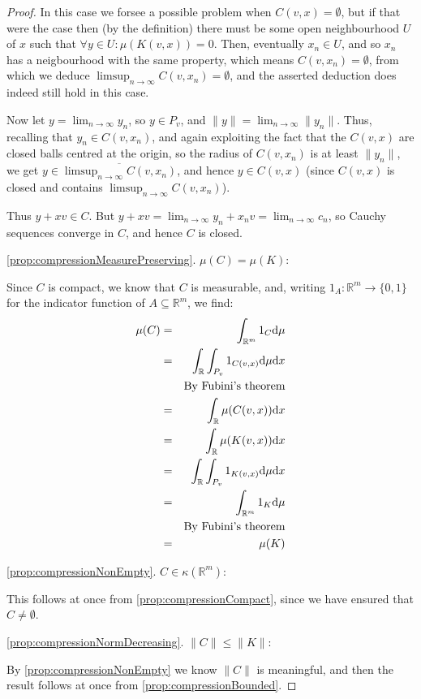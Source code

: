 \documentclass[a4paper,11pt]{article}
\newcommand{\rmd}{\textnormal{d}}
\newcommand{\bbR}{\mathbb{R}}
\newcommand{\lV}{\lVert}
\newcommand{\rV}{\rVert}
\begin{document}
\begin{proof}
In this case we forsee a possible problem when $C(v,x)=\emptyset$, but if that
were the case then (by the definition)
there must be some open neighbourhood $U$ of $x$ such that
$\forall y\in U:\mu(K(v,x))=0$.  Then, eventually $x_n\in U$, and so
$x_n$ has a neigbourhood with the same property, which means
$C(v,x_n)=\emptyset$,
from which we deduce $\limsup_{n\to\infty}C(v,x_n)=\emptyset$, and the asserted
deduction does indeed still hold in this case.

Now let $y=\lim_{n\to\infty} y_n$, so $y\in P_v$,
and $\lV y\rV=\lim_{n\to\infty}\lV y_n\rV$.  Thus,
recalling that $y_n\in C(v,x_n)$, and again exploiting the fact that the
$C(v,x)$ are closed balls centred at the origin, so the radius of $C(v,x_n)$ is
at least $\lV y_n\rV$, we get $y\in\overline{\limsup_{n\to\infty}C(v,x_n)}$,
and hence $y\in C(v,x)$
(since $C(v,x)$ is closed and contains $\limsup_{n\to\infty}C(v,x_n)$).

Thus $y+xv\in C$.  But $y+xv=\lim_{n\to\infty} y_n+x_nv=\lim_{n\to\infty} c_n$,
so Cauchy sequences
converge in $C$, and hence $C$ is closed.

\ref{prop:compressionMeasurePreserving}. $\mu(C)=\mu(K)$:

Since $C$ is compact, we know that $C$ is measurable, and, writing
$1_A:\bbR^m\to\{0,1\}$ for the indicator
function of $A\subseteq\bbR^m$, we find:
%
\begin{eqnarray*}
\mu(C)
&=& \int_{\bbR^m}1_C\rmd\mu \\
&=& \int_\bbR\int_{P_v}1_{C(v,x)}\rmd\mu\rmd x \\
&& \textrm{By Fubini's theorem} \\
&=& \int_\bbR\mu(C(v,x))\rmd x \\
&=& \int_\bbR\mu(K(v,x))\rmd x \\
&=& \int_\bbR\int_{P_v}1_{K(v,x)}\rmd\mu\rmd x \\
&=& \int_{\bbR^m}1_K\rmd\mu \\
&& \textrm{By Fubini's theorem} \\
&=& \mu(K)
\end{eqnarray*}

\ref{prop:compressionNonEmpty}.
$C\in\kappa(\bbR^m)$:

This follows at once from \ref{prop:compressionCompact}, since we have ensured
that $C\not=\emptyset$.

\ref{prop:compressionNormDecreasing}.
$\lV C\rV\leq\lV K\rV$:

By \ref{prop:compressionNonEmpty} we know $\lV C\rV$ is meaningful, and then
the result follows at once from \ref{prop:compressionBounded}.


\end{proof}
\end{document}
